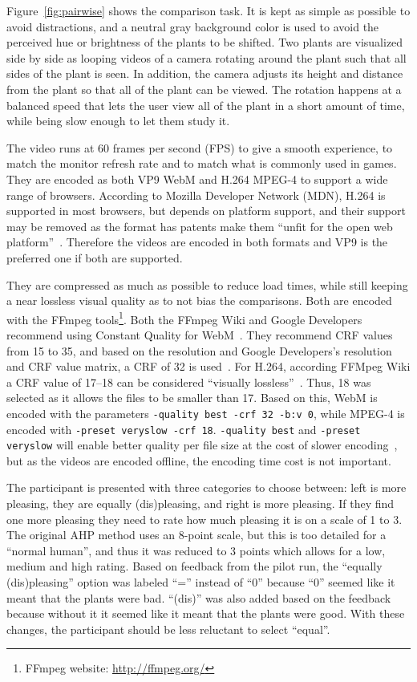 Figure~\ref{fig:pairwise} shows the comparison task.
It is kept as simple as possible to avoid distractions, and a neutral gray background color is used to avoid the perceived hue or brightness of the plants to be shifted.
Two plants are visualized side by side as looping videos of a camera rotating around the plant such that all sides of the plant is seen.
In addition, the camera adjusts its height and distance from the plant so that all of the plant can be viewed.
The rotation happens at a balanced speed that lets the user view all of the plant in a short amount of time, while being slow enough to let them study it.

The video runs at 60 frames per second (FPS) to give a smooth experience, to match the monitor refresh rate and to match what is commonly used in games.
They are encoded as both VP9 WebM and H.264 MPEG-4 to support a wide range of browsers.
According to Mozilla Developer Network (MDN), H.264 is supported in most browsers, but depends on platform support, and their support may be removed as the format has patents make them ``unfit for the open web platform''~\cite{mdn-video}.
Therefore the videos are encoded in both formats and VP9 is the preferred one if both are supported.

They are compressed as much as possible to reduce load times, while still keeping a near lossless visual quality as to not bias the comparisons.
Both are encoded with the FFmpeg tools\footnote{FFmpeg website: \url{http://ffmpeg.org/}}.
Both the FFmpeg Wiki and Google Developers recommend using Constant Quality for WebM~\cite{ffmpeg-vp9,google-vp9}.
They recommend CRF values from 15 to 35, and based on the resolution and Google Developers's resolution and CRF value matrix, a CRF of 32 is used~\cite{ffmpeg-vp9,google-vp9}.
For H.264, according FFMpeg Wiki a CRF value of 17--18 can be considered ``visually lossless''~\cite{ffmpeg-h264}.
Thus, 18 was selected as it allows the files to be smaller than 17.
Based on this, WebM is encoded with the parameters \texttt{-quality best -crf 32 -b:v 0}, while MPEG-4 is encoded with \texttt{-preset veryslow -crf 18}.
\texttt{-quality best} and \texttt{-preset veryslow} will enable better quality per file size at the cost of slower encoding~\cite{ffmpeg-h264}, but as the videos are encoded offline, the encoding time cost is not important.

The participant is presented with three categories to choose between: left is more pleasing, they are equally (dis)pleasing, and right is more pleasing.
If they find one more pleasing they need to rate how much pleasing it is on a scale of 1 to 3.
The original AHP method uses an 8-point scale,%
but this is too detailed for a ``normal human'',%
and thus it was reduced to 3 points which allows for a low, medium and high rating.
Based on feedback from the pilot run, the ``equally (dis)pleasing'' option was labeled ``='' instead of ``0'' because ``0'' seemed like it meant that the plants were bad.
``(dis)'' was also added based on the feedback because without it it seemed like it meant that the plants were good.
With these changes, the participant should be less reluctant to select ``equal''.

